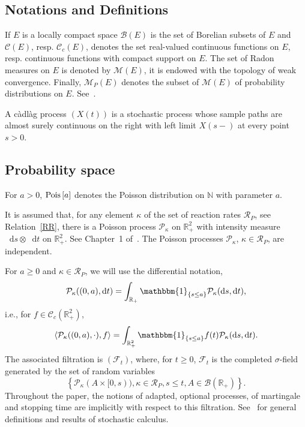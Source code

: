 \documentclass[english]{amsart}
\newcommand{\N}{\ensuremath{\mathbb{N}}}
\newcommand{\R}{\ensuremath{\mathbb{R}}}
\newcommand{\ind}[1]{\ensuremath{\mathbbm{1}_{\left\{#1\right\}}}}
\newcommand{\diff}{\mathop{}\mathopen{}\mathrm{d}}
\newcommand{\cal}[1]{\ensuremath{\mathcal{#1}}}
\newcommand\croc[1]{\left\langle #1\right\rangle}
\def\cadlag{c\`adl\`ag }
\newcommand\Pois[1]{{\rm Pois}\left[#1\right]}
\numberwithin{proposition}{section}
\begin{document}
\subsection{Notations and Definitions}
If $E$ is a locally compact space ${\cal B}(E)$ is the set of Borelian subsets of $E$ and ${\cal C}(E)$, resp. ${\cal C}_c(E)$, denotes the set real-valued continuous functions on $E$, resp. continuous functions with compact support on $E$. The set of Radon measures on $E$ is denoted by ${\cal M}(E)$, it is endowed with the topology of weak convergence. Finally, ${\cal M}_P(E)$ denotes the subset of ${\cal M}(E)$ of probability distributions on $E$. See~\citet{Rudin}. 

A \cadlag process $(X(t))$ is a stochastic process whose sample paths are almost surely continuous on the right with left limit $X(s{-})$ at every point $s{>}0$. 

\subsection*{Probability space}
For $a{>}0$, $\Pois{a}$ denotes the Poisson distribution on $\N$ with parameter $a$. 

It is assumed that, for any element $\kappa$ of the set of reaction rates ${\cal R}_P$, see Relation~\eqref{RR}, there is a Poisson process  ${\cal P}_\kappa$ on $\R_+^2$ with intensity measure $\diff s{\otimes}\diff t$ on $\R_+^2$. See Chapter~1 of~\citet{Robert}. The Poisson processes ${\cal P}_\kappa$, $\kappa{\in}{\cal R}_P$, are independent.  

For $a{\ge}0$ and $\kappa{\in}{\cal R}_P$, we will use  the differential notation, 
\[
  {\cal P}_\kappa((0,a),\diff t) =\int_{\R_+}\ind{s{\le}a}{\cal P}_\kappa(\diff s,\diff t), 
\]
i.e., for $f{\in}{\cal C}_c(\R_+^2)$,
\[
\croc{{\cal P}_\kappa((0,a), \cdot),f}=\int_{\R_+^2}\ind{s{\le}a}f(t){\cal P}_\kappa(\diff s,\diff t).
\]
The associated filtration is $({\cal F}_t)$, where, for $t{\ge}0$,  ${\cal F}_t$ is the completed  $\sigma$-field generated by the set of random variables
\begin{equation}\label{SDEFilt}
\left\{{\cal P}_\kappa(A{\times}[0,s)), \kappa{\in}{\cal R}_P, s{\le}t, A{\in}{\cal B}(\R_+)\right\}. 
\end{equation}
Throughout the paper, the notions of adapted, optional processes, of martingale and stopping time are implicitly with respect to this filtration. See~\citet{Rogers2} for general definitions  and results of stochastic calculus. 
\end{document}

